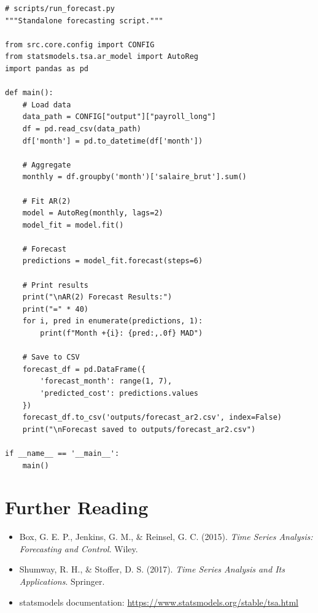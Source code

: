 \begin{lstlisting}[style=pythonstyle]
# scripts/run_forecast.py
"""Standalone forecasting script."""

from src.core.config import CONFIG
from statsmodels.tsa.ar_model import AutoReg
import pandas as pd

def main():
    # Load data
    data_path = CONFIG["output"]["payroll_long"]
    df = pd.read_csv(data_path)
    df['month'] = pd.to_datetime(df['month'])
    
    # Aggregate
    monthly = df.groupby('month')['salaire_brut'].sum()
    
    # Fit AR(2)
    model = AutoReg(monthly, lags=2)
    model_fit = model.fit()
    
    # Forecast
    predictions = model_fit.forecast(steps=6)
    
    # Print results
    print("\nAR(2) Forecast Results:")
    print("=" * 40)
    for i, pred in enumerate(predictions, 1):
        print(f"Month +{i}: {pred:,.0f} MAD")
    
    # Save to CSV
    forecast_df = pd.DataFrame({
        'forecast_month': range(1, 7),
        'predicted_cost': predictions.values
    })
    forecast_df.to_csv('outputs/forecast_ar2.csv', index=False)
    print("\nForecast saved to outputs/forecast_ar2.csv")

if __name__ == '__main__':
    main()
\end{lstlisting}

\section{Further Reading}

\begin{itemize}
    \item Box, G. E. P., Jenkins, G. M., \& Reinsel, G. C. (2015). \textit{Time Series Analysis: Forecasting and Control}. Wiley.
    \item Shumway, R. H., \& Stoffer, D. S. (2017). \textit{Time Series Analysis and Its Applications}. Springer.
    \item statsmodels documentation: \url{https://www.statsmodels.org/stable/tsa.html}
\end{itemize}
